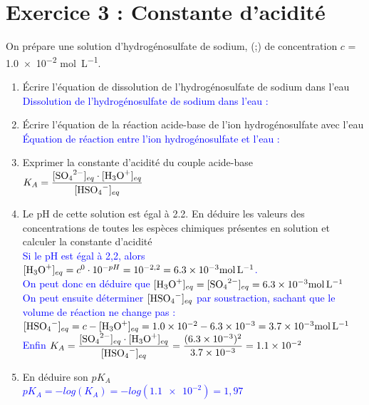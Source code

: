 \documentclass[a4paper,12pt]{article}
\begin{document}
\section*{Exercice 3 : Constante d'acidité}
On prépare une solution d'hydrogénosulfate de sodium, (;) de concentration $c$ = \num{1,0e-2} \unit{\mole \per \liter}.
\begin{enumerate}
	\item Écrire l'équation de dissolution de l'hydrogénosulfate de sodium dans l'eau\\
	\textcolor{blue}{Dissolution de l'hydrogénosulfate de sodium dans l'eau : }
	\item Écrire l'équation de la réaction acide-base de l'ion hydrogénosulfate avec l'eau\\
	\textcolor{blue}{Équation de réaction entre l'ion hydrogénosulfate et l'eau : }
	\item Exprimer la constante d'acidité du couple acide-base\\
	\textcolor{blue}{$K_A = \dfrac{[\ce{SO4^{2-}}]_{eq}\cdot [\ce{H3O+}]_{eq}}{[\ce{HSO4-}]_{eq}}$}
	\item Le pH de cette solution est égal à \num{2,2}. En déduire les valeurs des concentrations de toutes les espèces chimiques présentes en solution et calculer la constante d'acidité\\
	\textcolor{blue}{Si le pH est égal à 2,2, alors $[\ce{H3O+}]_{eq} = c^0 \cdot 10^{-pH} = 10^{-2,2} = \num{6,3e-3}\unit{\mole\per\liter}$.\\ On peut donc en déduire que $[\ce{H3O+}]_{eq} =[\ce{SO4^{2-}}]_{eq}=\num{6,3e-3}\unit{\mole\per\liter}$\\ On peut ensuite déterminer $[\ce{HSO4-}]_{eq}$ par soustraction, sachant que le volume de réaction ne change pas : $[\ce{HSO4-}]_{eq} = c-[\ce{H3O+}]_{eq} = \num{1,0e-2}-\num{6,3e-3} = \num{3,7e-3}\unit{\mole\per\liter}$\\ Enfin $K_A = \dfrac{[\ce{SO4^{2-}}]_{eq}\cdot [\ce{H3O+}]_{eq}}{[\ce{HSO4-}]_{eq}} =\dfrac{(\num{6,3e-3})^2}{\num{3,7e-3}} =\num{1,1e-2}$}
	\item En déduire son $pK_A$\\
	\textcolor{blue}{$pK_A =-log(K_A)=-log(\num{1,1e-2})=1,97$}
\end{enumerate}
\end{document}
